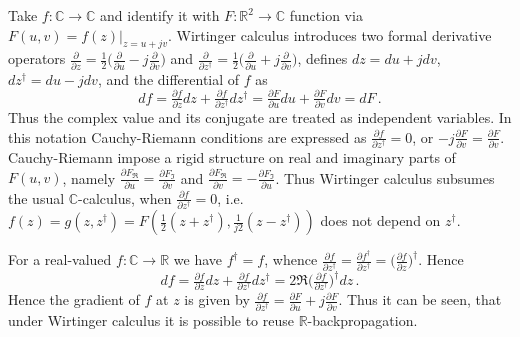 \documentclass[a4paper,10pt]{article}
\newcommand{\real}{\mathbb{R}}
\newcommand{\hop}{\dagger}
\newcommand{\cplx}{\mathbb{C}}
\begin{document}
Take $f\colon \cplx \to \cplx$ and identify it with $F\colon \real^2 \to \cplx$ function
via $F(u, v) = f(z)\vert_{z=u + j v}$. Wirtinger calculus introduces two formal derivative
operators
$
  \tfrac{\partial}{\partial z}
    = \tfrac12 \bigl(
      \tfrac{\partial}{\partial u}
      - j \tfrac{\partial}{\partial v}
    \bigr)
$ and $
  \tfrac{\partial}{\partial z^\hop}
    = \tfrac12 \bigl(
      \tfrac{\partial}{\partial u}
      + j \tfrac{\partial}{\partial v}
    \bigr)
$, defines $dz = du + j dv$, $dz^\hop = du - j dv$, and the differential of $f$ as
$$
df = \tfrac{\partial f}{\partial z} dz
    + \tfrac{\partial f}{\partial z^\hop} dz^\hop
   = \tfrac{\partial F}{\partial u} du
     + \tfrac{\partial F}{\partial v} dv
   = dF
  \,. $$
Thus the complex value and its conjugate are treated as independent variables. In this notation
Cauchy-Riemann conditions are expressed as $
  \tfrac{\partial f}{\partial z^\hop} = 0
$, or $
  -j\tfrac{\partial F}{\partial v} = \tfrac{\partial F}{\partial v}
$. Cauchy-Riemann impose a rigid structure on real and imaginary parts of $F(u, v)$, namely $
  \tfrac{\partial F_{\Re }}{\partial u} = \tfrac{\partial F_{\Im }}{\partial v}
$ and $
  \tfrac{\partial F_{\Re }}{\partial v} = - \tfrac{\partial F_{\Im }}{\partial u}
$. Thus Wirtinger calculus subsumes the usual $\cplx$-calculus, when $
  \tfrac{\partial f}{\partial z^\hop} = 0
$, i.e. $
  f(z) = g(z, z^\hop) = F(\tfrac12 (z + z^\hop), \tfrac1{j 2} (z - z^\hop))
$ does not depend on $z^\hop$.

For a real-valued $f\colon \cplx \to \real$ we have $f^\hop = f$, whence $
  \tfrac{\partial f}{\partial z^\hop}
    = \tfrac{\partial f^\hop}{\partial z^\hop}
    = \bigl(\tfrac{\partial f}{\partial z} \bigr)^\hop
$. Hence
$$
df
  = \tfrac{\partial f}{\partial z} dz
    + \tfrac{\partial f}{\partial z^\hop} dz^\hop
  = 2 \Re \bigl( \tfrac{\partial f}{\partial z^\hop} \bigr)^\hop dz
  \,. $$
Hence the gradient of $f$ at $z$ is given by $
  \tfrac{\partial f}{\partial z^\hop}
    = \tfrac{\partial F}{\partial u}
      + j \tfrac{\partial F}{\partial v}
$. Thus it can be seen, that under Wirtinger calculus it is possible to reuse $\real$-backpropagation.
\end{document}

